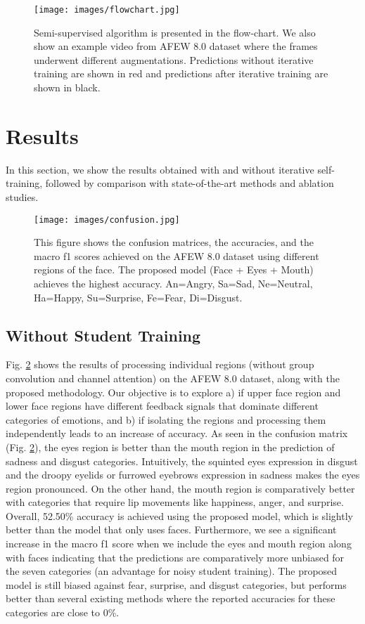 \documentclass[runningheads]{llncs}
\begin{document}
\begin{figure}[t!]
\centering
\texttt{[image: images/flowchart.jpg]}
\caption{Semi-supervised algorithm is presented in the flow-chart. We also show an example video from AFEW 8.0 dataset where the frames underwent different augmentations. Predictions without iterative training are shown in red and predictions after iterative training are shown in black.}
\label{fig:flowchart}
\end{figure}




\section{Results}
In this section, we show the results obtained with and without iterative self-training, followed by comparison with state-of-the-art methods and ablation studies.
\begin{figure}[t!]
\centering
\texttt{[image: images/confusion.jpg]}
\caption{This figure shows the confusion matrices, the accuracies, and the macro f1 scores achieved on the AFEW 8.0 dataset using different regions of the face. The proposed model (Face + Eyes + Mouth) achieves the highest accuracy. An=Angry, Sa=Sad, Ne=Neutral, Ha=Happy, Su=Surprise, Fe=Fear, Di=Disgust.}
\label{fig:confusion}
\end{figure}

\subsection{Without Student Training}
Fig. \ref{fig:confusion} shows the results of processing individual regions (without group convolution and channel attention) on the AFEW 8.0 dataset, along with the proposed methodology. Our objective is to explore a) if upper face region and lower face regions have different feedback signals that dominate different categories of emotions, and b) if isolating the regions and processing them independently leads to an increase of accuracy. As seen in the confusion matrix (Fig. \ref{fig:confusion}), the eyes region is better than the mouth region in the prediction of sadness and disgust categories. Intuitively, the squinted eyes expression in disgust and the droopy eyelids or furrowed eyebrows expression in sadness makes the eyes region pronounced. On the other hand, the mouth region is comparatively better with categories that require lip movements like happiness, anger, and surprise. Overall, 52.50\% accuracy is achieved using the proposed model, which is slightly better than the model that only uses faces. Furthermore, we see a significant increase in the macro f1 score when we include the eyes and mouth region along with faces indicating that the predictions are comparatively more unbiased for the seven categories (an advantage for noisy student training). The proposed model is still biased against fear, surprise, and disgust categories, but performs better than several existing methods \cite{lu2018multiple,acharya2018covariance,yan2018multi} where the reported accuracies for these categories are close to 0\%.
\end{document}
